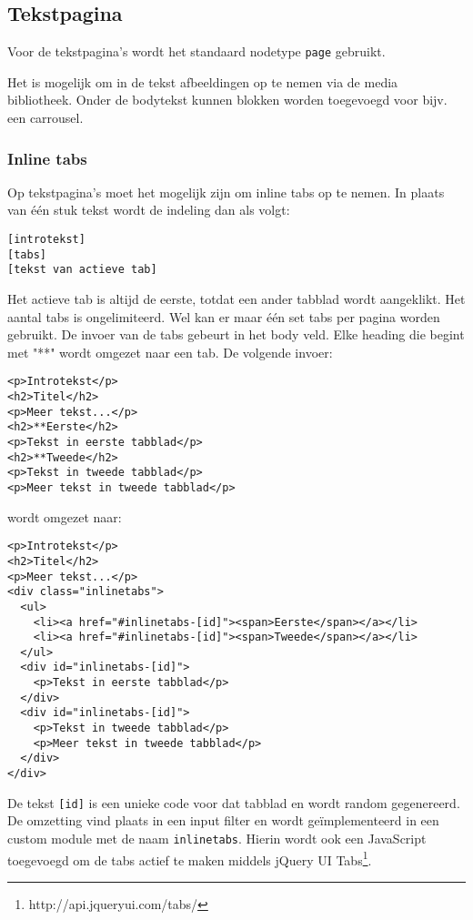 \subsection{Tekstpagina}\label{tekstpagina}

Voor de tekstpagina's wordt het standaard nodetype \texttt{page} gebruikt.

Het is mogelijk om in de tekst afbeeldingen op te nemen via de media bibliotheek. Onder de bodytekst kunnen blokken worden toegevoegd voor bijv. een carrousel.

\subsubsection{Inline tabs}

Op tekstpagina's moet het mogelijk zijn om inline tabs op te nemen. In plaats van \'{e}\'{e}n stuk tekst wordt de indeling dan als volgt:
\begin{verbatim}
[introtekst]
[tabs]
[tekst van actieve tab]
\end{verbatim}
Het actieve tab is altijd de eerste, totdat een ander tabblad wordt aangeklikt. Het aantal tabs is ongelimiteerd. Wel kan er maar \'{e}\'{e}n set tabs per pagina worden gebruikt.
De invoer van de tabs gebeurt in het body veld. Elke heading die begint met "**" wordt omgezet naar een tab. De volgende invoer:
\begin{verbatim}
<p>Introtekst</p>
<h2>Titel</h2>
<p>Meer tekst...</p>
<h2>**Eerste</h2>
<p>Tekst in eerste tabblad</p>
<h2>**Tweede</h2>
<p>Tekst in tweede tabblad</p>
<p>Meer tekst in tweede tabblad</p>
\end{verbatim}
wordt omgezet naar:
\begin{verbatim}
<p>Introtekst</p>
<h2>Titel</h2>
<p>Meer tekst...</p>
<div class="inlinetabs">
  <ul>
    <li><a href="#inlinetabs-[id]"><span>Eerste</span></a></li>
    <li><a href="#inlinetabs-[id]"><span>Tweede</span></a></li>
  </ul>
  <div id="inlinetabs-[id]">
    <p>Tekst in eerste tabblad</p>
  </div>
  <div id="inlinetabs-[id]">
    <p>Tekst in tweede tabblad</p>
    <p>Meer tekst in tweede tabblad</p>
  </div>
</div>
\end{verbatim}
De tekst \texttt{[id]} is een unieke code voor dat tabblad en wordt random gegenereerd. De omzetting vind plaats in een input filter en wordt ge\"{i}mplementeerd in een custom module met de naam \texttt{inlinetabs}. Hierin wordt ook een JavaScript toegevoegd om de tabs actief te maken middels jQuery UI Tabs\footnote{http://api.jqueryui.com/tabs/}.

